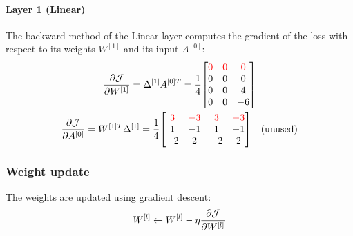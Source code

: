 \paragraph{Layer 1 (Linear)} The backward method of the Linear layer computes the gradient of the loss with respect to its weights $W^{[1]}$ and its input $A^{[0]}$:
\begin{gather*}
    \pdv{\J}{W^{[1]}} = \Delta^{[1]} A^{[0]T} = \frac{1}{4} \mqty[
        \color{red} 0 & \color{red} 0 & \color{red} 0 \\
        0 & 0 & 0 \\
        0 & 0 & 4 \\
        0 & 0 & -6
    ]\\
    \pdv{\J}{A^{[0]}} = W^{[1]T} \Delta^{[1]} = \frac{1}{4} \mqty[
        \color{red} 3 & \color{red} -3 & \color{red} 3 & \color{red} -3 \\
        1 & -1 & 1 & -1 \\
        -2 & 2 & -2 & 2
    ] \quad \text{(unused)}
\end{gather*}

\subsubsection{Weight update}

The weights are updated using gradient descent:
\begin{equation*}
    W^{[l]} \gets W^{[l]} - \eta \pdv{\mathcal{J}}{W^{[l]}} \\
\end{equation*}


